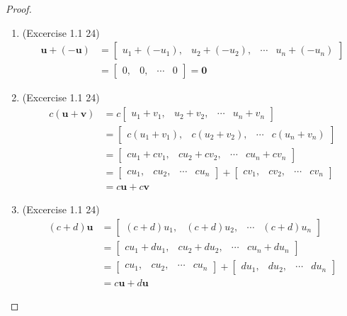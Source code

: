 \begin{proof}
\begin{enumerate}
        \item (Excercise 1.1 24)
            \begin{align*}
                \textbf{u}+(-\textbf{u})
                &= \begin{bmatrix} u_1+(-u_1), & u_2+(-u_2), & \cdots & u_n+(-u_n) \end{bmatrix} \\
                &= \begin{bmatrix} 0, & 0, & \cdots & 0 \end{bmatrix} = \textbf{0}
            \end{align*}
        
        \item (Excercise 1.1 24)
            \begin{align*}
                c(\textbf{u}+\textbf{v})
                &= c \begin{bmatrix} u_1+v_1, & u_2+v_2, & \cdots & u_n+v_n \end{bmatrix} \\
                &= \begin{bmatrix} c(u_1+v_1), & c(u_2+v_2), & \cdots & c(u_n+v_n) \end{bmatrix} \\
                &= \begin{bmatrix} cu_1+cv_1, & cu_2+cv_2, & \cdots & cu_n+cv_n \end{bmatrix} \\
                &= \begin{bmatrix} cu_1, & cu_2, & \cdots & cu_n \end{bmatrix} +
                   \begin{bmatrix} cv_1, & cv_2, & \cdots & cv_n \end{bmatrix} \\
                &= c\textbf{u}+c\textbf{v}
            \end{align*}
        
        \item (Excercise 1.1 24)
            \begin{align*}
                (c+d)\textbf{u}
                &= \begin{bmatrix} (c+d)u_1, & (c+d)u_2, & \cdots & (c+d)u_n \end{bmatrix} \\
                &= \begin{bmatrix} cu_1+du_1, & cu_2+du_2, & \cdots & cu_n+du_n \end{bmatrix} \\
                &= \begin{bmatrix} cu_1, & cu_2, & \cdots & cu_n \end{bmatrix} +
                   \begin{bmatrix} du_1, & du_2, & \cdots & du_n \end{bmatrix} \\
                &= c\textbf{u}+d\textbf{u}
            \end{align*}
        

\end{enumerate}
\end{proof}
